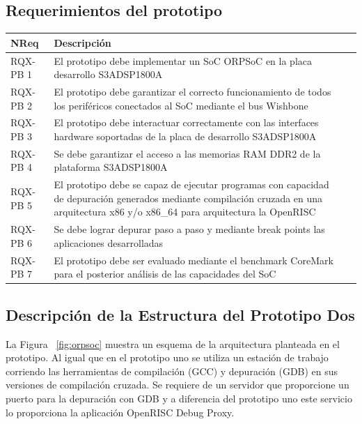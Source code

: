 		\subsection{Requerimientos del prototipo}
		\begin{table}[h!]
		\centering
		\begin{tabular}{ p{2.5cm} p{8cm} p{3cm} }
		\hline 
		\rowcolor[gray]{0.8} N\textordmasculine Req & Descripción\\
		\hline 
		RQX-PB 1 & El prototipo debe implementar un SoC ORPSoC en la placa desarrollo S3ADSP1800A\\ 
		\hline 
		RQX-PB 2 & El prototipo debe garantizar el correcto funcionamiento de todos los periféricos conectados al SoC mediante el bus Wishbone\\ 
		\hline 
		RQX-PB 3 & El prototipo debe interactuar correctamente con las interfaces hardware soportadas de la placa de desarrollo S3ADSP1800A\\ 
		\hline
		RQX-PB 4 & Se debe garantizar el acceso a las memorias RAM DDR2 de la plataforma S3ADSP1800A\\
		\hline
		RQX-PB 5 & El prototipo debe se capaz de ejecutar programas con capacidad de depuración generados mediante compilación
		cruzada en una arquitectura x86 y/o x86\_64 para arquitectura la OpenRISC\\
		\hline
		RQX-PB 6 & Se debe lograr depurar paso a paso y mediante break points las aplicaciones desarrolladas\\
		\hline
		RQX-PB 7 & El prototipo debe ser evaluado mediante el benchmark CoreMark para el posterior análisis de las capacidades del SoC\\
		\hline		
		\end{tabular}
		\end{table}

		\subsection{Descripción de la Estructura del Prototipo Dos}
		La Figura ~\ref{fig:orpsoc} muestra un esquema de la arquitectura planteada en el prototipo. Al igual que en el prototipo uno se utiliza un estación
		de trabajo corriendo las herramientas de compilación (GCC) y depuración (GDB) en sus versiones de compilación cruzada. Se requiere de un servidor
		que proporcione un puerto para la depuración con GDB y a diferencia del prototipo uno este servicio lo proporciona la aplicación OpenRISC Debug
		Proxy.
		
